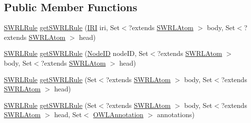 \subsection*{Public Member Functions}
\begin{DoxyCompactItemize}
\item 
\hyperlink{interfaceorg_1_1semanticweb_1_1owlapi_1_1model_1_1_s_w_r_l_rule}{S\-W\-R\-L\-Rule} \hyperlink{interfaceorg_1_1semanticweb_1_1owlapi_1_1model_1_1_s_w_r_l_data_factory_a8c72eb847e46d0780ea26c0bd867121c}{get\-S\-W\-R\-L\-Rule} (\hyperlink{classorg_1_1semanticweb_1_1owlapi_1_1model_1_1_i_r_i}{I\-R\-I} iri, Set$<$?extends \hyperlink{interfaceorg_1_1semanticweb_1_1owlapi_1_1model_1_1_s_w_r_l_atom}{S\-W\-R\-L\-Atom} $>$ body, Set$<$?extends \hyperlink{interfaceorg_1_1semanticweb_1_1owlapi_1_1model_1_1_s_w_r_l_atom}{S\-W\-R\-L\-Atom} $>$ head)
\item 
\hyperlink{interfaceorg_1_1semanticweb_1_1owlapi_1_1model_1_1_s_w_r_l_rule}{S\-W\-R\-L\-Rule} \hyperlink{interfaceorg_1_1semanticweb_1_1owlapi_1_1model_1_1_s_w_r_l_data_factory_a3ae0d09799691b6737557b69a4dc2c5a}{get\-S\-W\-R\-L\-Rule} (\hyperlink{classorg_1_1semanticweb_1_1owlapi_1_1model_1_1_node_i_d}{Node\-I\-D} node\-I\-D, Set$<$?extends \hyperlink{interfaceorg_1_1semanticweb_1_1owlapi_1_1model_1_1_s_w_r_l_atom}{S\-W\-R\-L\-Atom} $>$ body, Set$<$?extends \hyperlink{interfaceorg_1_1semanticweb_1_1owlapi_1_1model_1_1_s_w_r_l_atom}{S\-W\-R\-L\-Atom} $>$ head)
\item 
\hyperlink{interfaceorg_1_1semanticweb_1_1owlapi_1_1model_1_1_s_w_r_l_rule}{S\-W\-R\-L\-Rule} \hyperlink{interfaceorg_1_1semanticweb_1_1owlapi_1_1model_1_1_s_w_r_l_data_factory_a2c055768c436815c020c22bbc7975ec3}{get\-S\-W\-R\-L\-Rule} (Set$<$?extends \hyperlink{interfaceorg_1_1semanticweb_1_1owlapi_1_1model_1_1_s_w_r_l_atom}{S\-W\-R\-L\-Atom} $>$ body, Set$<$?extends \hyperlink{interfaceorg_1_1semanticweb_1_1owlapi_1_1model_1_1_s_w_r_l_atom}{S\-W\-R\-L\-Atom} $>$ head)
\item 
\hyperlink{interfaceorg_1_1semanticweb_1_1owlapi_1_1model_1_1_s_w_r_l_rule}{S\-W\-R\-L\-Rule} \hyperlink{interfaceorg_1_1semanticweb_1_1owlapi_1_1model_1_1_s_w_r_l_data_factory_a7b3ee005f42b8fdba7ab7cc82b88517e}{get\-S\-W\-R\-L\-Rule} (Set$<$?extends \hyperlink{interfaceorg_1_1semanticweb_1_1owlapi_1_1model_1_1_s_w_r_l_atom}{S\-W\-R\-L\-Atom} $>$ body, Set$<$?extends \hyperlink{interfaceorg_1_1semanticweb_1_1owlapi_1_1model_1_1_s_w_r_l_atom}{S\-W\-R\-L\-Atom} $>$ head, Set$<$ \hyperlink{interfaceorg_1_1semanticweb_1_1owlapi_1_1model_1_1_o_w_l_annotation}{O\-W\-L\-Annotation} $>$ annotations)

\end{DoxyCompactItemize}
